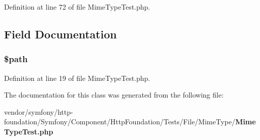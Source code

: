 Definition at line 72 of file Mime\+Type\+Test.\+php.



\subsection{Field Documentation}
\subsubsection[{\$path}]{\setlength{\rightskip}{0pt plus 5cm}\${\bf path}\hspace{0.3cm}{\ttfamily [protected]}}\label{class_symfony_1_1_component_1_1_http_foundation_1_1_tests_1_1_file_1_1_mime_type_1_1_mime_type_test_a0a4baf0b22973c07685c3981f0d17fc4}


Definition at line 19 of file Mime\+Type\+Test.\+php.



The documentation for this class was generated from the following file\+:\begin{DoxyCompactItemize}
\item 
vendor/symfony/http-\/foundation/\+Symfony/\+Component/\+Http\+Foundation/\+Tests/\+File/\+Mime\+Type/{\bf Mime\+Type\+Test.\+php}\end{DoxyCompactItemize}
